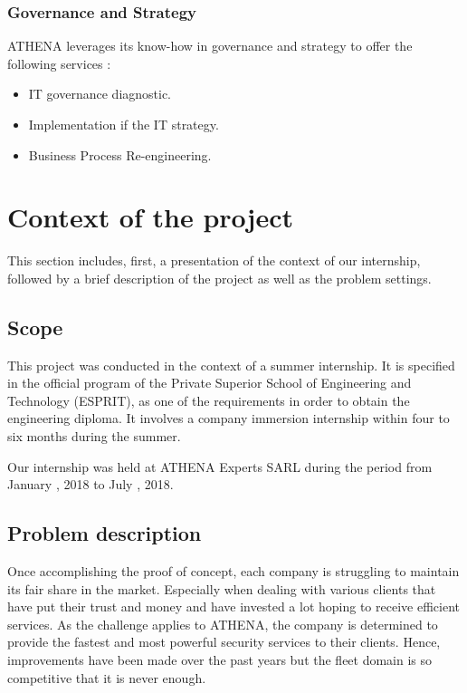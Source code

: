 \subsubsection{Governance and Strategy}
ATHENA leverages its know-how in governance and strategy to offer the following services :
\begin{itemize}
    \item IT governance diagnostic.
    \item Implementation if the IT strategy.
    \item Business Process Re-engineering.
\end{itemize}

\section{Context of the project}

This section includes, first, a presentation of the context of our internship, followed by a brief description of the project as well as the problem settings.

\subsection{Scope}

This project was conducted in the context of a summer internship. It is specified in the official program of the Private Superior School of Engineering and Technology (ESPRIT), as one of the requirements in order to obtain the engineering diploma. It involves a company immersion internship within four to six months during the summer. 

Our internship was held at ATHENA Experts SARL during the period from January , 2018 to July , 2018.

\subsection{Problem description} 


Once accomplishing the proof of concept, each company is struggling to maintain its fair share in the market. Especially when dealing with various clients that have put their trust and money and have invested a lot hoping to receive efficient services. As the challenge applies to ATHENA, the company is determined to provide the fastest and most powerful security services to their clients. Hence, improvements have been made over the past years but the fleet domain is so competitive that it is never enough.

